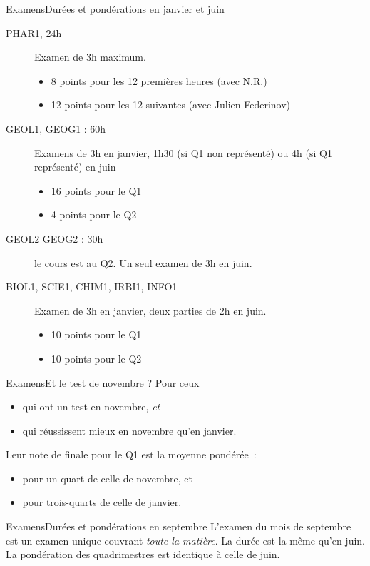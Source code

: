 \begin{frame} {Examens}{Durées et pondérations en janvier et juin}
  \begin{description}
  \item [PHAR1, 24h] Examen de 3h maximum.
    \begin{itemize}
    \item 8 points pour les 12 premières heures (avec N.R.)
    \item 12 points pour les 12 suivantes (avec Julien Federinov)
    \end{itemize}

  \item[GEOL1, GEOG1 : 60h] Examens de 3h en janvier, 1h30 (si Q1 non représenté) ou 4h (si Q1 représenté) en juin
    \begin{itemize}
    \item 16 points pour le Q1
    \item 4 points pour le Q2
    \end{itemize}
  \item[GEOL2 GEOG2 : 30h] le cours est au Q2. Un seul examen de 3h en juin.
  \item[BIOL1, SCIE1, CHIM1, IRBI1, INFO1] Examen de 3h en janvier, deux parties de 2h en juin.
    \begin{itemize}
    \item 10 points pour le Q1
    \item 10 points pour le Q2
    \end{itemize}
  \end{description}
\end{frame}
\begin{frame}{Examens}{Et le test de novembre ?}
  Pour ceux
  \begin{itemize}
  \item qui ont un test en novembre, \emph{et}
  \item qui réussissent mieux en novembre qu'en janvier.
  \end{itemize}
  Leur note de finale pour le Q1 est la moyenne pondérée~:
  \begin{itemize}
  \item pour un quart de celle de novembre, et
  \item pour trois-quarts de celle de janvier.
  \end{itemize}
\end{frame}
\begin{frame}{Examens}{Durées et pondérations en septembre}
  L'examen du mois de septembre est un examen unique couvrant \emph{toute la matière}. La durée est la même qu'en juin. La pondération des quadrimestres est identique à celle de juin.
\end{frame}
